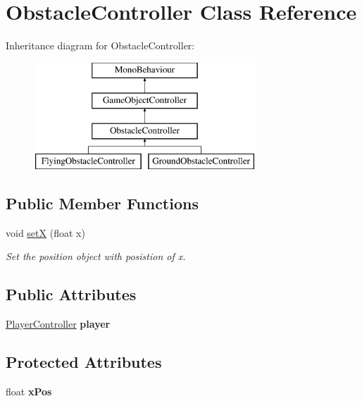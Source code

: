 \hypertarget{class_obstacle_controller}{}\section{Obstacle\+Controller Class Reference}
\label{class_obstacle_controller}
Inheritance diagram for Obstacle\+Controller\+:\begin{figure}[H]
\begin{center}
\leavevmode
\includegraphics[height=4.000000cm]{class_obstacle_controller}
\end{center}
\end{figure}
\subsection*{Public Member Functions}
\begin{DoxyCompactItemize}
\item 
void \hyperlink{class_obstacle_controller_a74a4fcc11a02b51cf45c15a90e089e1a}{setX} (float x)
\begin{DoxyCompactList}\small\item\em Set the position object with posistion of x. \end{DoxyCompactList}\end{DoxyCompactItemize}
\subsection*{Public Attributes}
\begin{DoxyCompactItemize}
\item 
\hypertarget{class_obstacle_controller_ac215b6b411516cf169e0aead277c8475}{}\label{class_obstacle_controller_ac215b6b411516cf169e0aead277c8475} 
\hyperlink{class_player_controller}{Player\+Controller} {\bfseries player}
\end{DoxyCompactItemize}
\subsection*{Protected Attributes}
\begin{DoxyCompactItemize}
\item 
\hypertarget{class_obstacle_controller_a17adb20fd7bff7aa48e4b650f9e72db4}{}\label{class_obstacle_controller_a17adb20fd7bff7aa48e4b650f9e72db4} 
float {\bfseries x\+Pos}
\end{DoxyCompactItemize}


